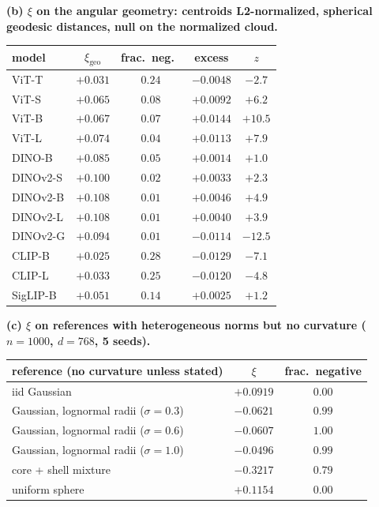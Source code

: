 \begin{table}[H]
\noindent\textbf{(b) $\xi$ on the angular geometry: centroids L2-normalized, spherical geodesic distances, null on the normalized cloud.}\par\vspace{1.5pt}
\begin{tabular}{lcccc}
\toprule
model & $\xi_{\text{geo}}$ & frac.\ neg.\ & excess & $z$ \\
\midrule
ViT-T & $+0.031$ & $0.24$ & $-0.0048$ & $-2.7$ \\
ViT-S & $+0.065$ & $0.08$ & $+0.0092$ & $+6.2$ \\
ViT-B & $+0.067$ & $0.07$ & $+0.0144$ & $+10.5$ \\
ViT-L & $+0.074$ & $0.04$ & $+0.0113$ & $+7.9$ \\
\midrule
DINO-B & $+0.085$ & $0.05$ & $+0.0014$ & $+1.0$ \\
DINOv2-S & $+0.100$ & $0.02$ & $+0.0033$ & $+2.3$ \\
DINOv2-B & $+0.108$ & $0.01$ & $+0.0046$ & $+4.9$ \\
DINOv2-L & $+0.108$ & $0.01$ & $+0.0040$ & $+3.9$ \\
DINOv2-G & $+0.094$ & $0.01$ & $-0.0114$ & $-12.5$ \\
\midrule
CLIP-B & $+0.025$ & $0.28$ & $-0.0129$ & $-7.1$ \\
CLIP-L & $+0.033$ & $0.25$ & $-0.0120$ & $-4.8$ \\
SigLIP-B & $+0.051$ & $0.14$ & $+0.0025$ & $+1.2$ \\
\bottomrule
\end{tabular}
\par\vspace{5pt}
\noindent\textbf{(c) $\xi$ on references with heterogeneous norms but no curvature ($n{=}1000$, $d{=}768$, 5 seeds).}\par\vspace{1.5pt}
\begin{tabular}{lcc}
\toprule
reference (no curvature unless stated) & $\xi$ & frac.\ negative \\
\midrule
iid Gaussian & $+0.0919$ & $0.00$ \\
Gaussian, lognormal radii ($\sigma{=}0.3$) & $-0.0621$ & $0.99$ \\
Gaussian, lognormal radii ($\sigma{=}0.6$) & $-0.0607$ & $1.00$ \\
Gaussian, lognormal radii ($\sigma{=}1.0$) & $-0.0496$ & $0.99$ \\
core + shell mixture & $-0.3217$ & $0.79$ \\
uniform sphere & $+0.1154$ & $0.00$ \\

\end{tabular}
\end{table}
